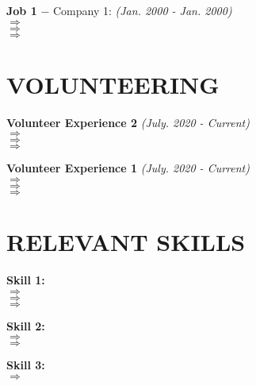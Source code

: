 \documentclass[letterpaper,1pt]{article}
\begin{document}
{\textbf{Job 1} $-$ Company 1:} \hfill \textit{ (Jan. 2000 - Jan. 2000)}\\
$\Rightarrow$ \\
$\Rightarrow$ \\
$\Rightarrow$ \\


\section*{VOLUNTEERING} 
{\textbf{Volunteer Experience 2}} \hfill \textit{(July. 2020 - Current)}\\
$\Rightarrow$ \\
$\Rightarrow$ \\
$\Rightarrow$ \\
\vspace{0.2cm}

{\textbf{Volunteer Experience 1}} \hfill \textit{(July. 2020 - Current)}\\
$\Rightarrow$ \\
$\Rightarrow$ \\
$\Rightarrow$ \\


\section*{RELEVANT SKILLS}
\textbf{Skill 1:}\\
$\Rightarrow$ \\
$\Rightarrow$ \\
$\Rightarrow$ \\
\vspace{0.2cm}

\textbf{Skill 2:}\\
$\Rightarrow$ \\
$\Rightarrow$ \\
\vspace{0.2cm}

\textbf{Skill 3:}\\
$\Rightarrow$
\end{document}
